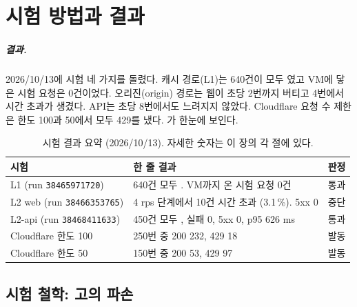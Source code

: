 \chapter{시험 방법과 결과}\label{ch:testing}

\paragraph{결과.}
2026/10/13에 시험 네 가지를 돌렸다.
캐시  경로(L1)는 640건이 모두 였고 VM에 닿은 시험 요청은 0건이었다.
오리진(origin)  경로는 웹이 초당 2번까지 버티고 4번에서 시간 초과가 생겼다.
API는 초당 8번에서도 느려지지 않았다.
Cloudflare 요청 수 제한은 한도 100과 50에서 모두 429를 냈다.
가 한눈에 보인다.

\begin{table}[H]
  \caption{시험 결과 요약 (2026/10/13). 자세한 숫자는 이 장의 각 절에 있다.}\label{tab:07-results-summary}
  \small
  \begin{tabularx}{\linewidth}{L{2.6cm} Y L{2.2cm}}
    \toprule
    시험 & 한 줄 결과 & 판정 \\
    \midrule
    L1 (run \texttt{38465971720}) & 640건 모두 . VM까지 온 시험 요청 0건 & 통과 \\
    \midrule
    L2 web (run \texttt{38466353765}) & 4 rps 단계에서 10건 시간 초과 (3.1\,\%). 5xx 0 & 중단 \\
    \midrule
    L2-api (run \texttt{38468411633}) & 450건 모두 , 실패 0, 5xx 0, p95 626 ms & 통과 \\
    \midrule
    Cloudflare 한도 100 & 250번 중 200 232, 429 18 & 발동 \\
    \midrule
    Cloudflare 한도 50 & 150번 중 200 53, 429 97 & 발동 \\
    \bottomrule
  \end{tabularx}
\end{table}

\section{시험 철학: 고의 파손}\label{sec:07-philosophy}

